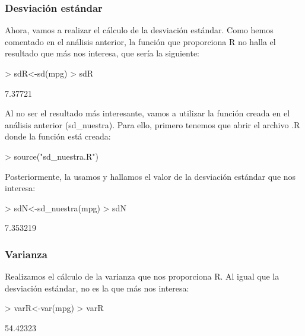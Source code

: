 \documentclass [a4paper] {article}
\begin{document}
\subsubsection{Desviación estándar}
Ahora, vamos a realizar el cálculo de la desviación estándar. Como hemos comentado en el análisis anterior,
la función que proporciona R no halla el resultado que más nos interesa, que sería la siguiente:

\begin{Schunk}
\begin{Sinput}
> sdR<-sd(mpg)
> sdR
\end{Sinput}
\begin{Soutput}
[1] 7.37721
\end{Soutput}
\end{Schunk}

Al no ser el resultado más interesante, vamos a utilizar la función creada en el análisis anterior (sd_nuestra). Para
ello, primero tenemos que abrir el archivo .R donde la función está creada:

\begin{Schunk}
\begin{Sinput}
> source("sd_nuestra.R")
\end{Sinput}
\end{Schunk}

Posteriormente, la usamos y hallamos el valor de la desviación estándar que nos interesa:

\begin{Schunk}
\begin{Sinput}
> sdN<-sd_nuestra(mpg)
> sdN
\end{Sinput}
\begin{Soutput}
[1] 7.353219
\end{Soutput}
\end{Schunk}

\subsubsection{Varianza}
Realizamos el cálculo de la varianza que nos proporciona R. Al igual que la desviación estándar,
no es la que más nos interesa:

\begin{Schunk}
\begin{Sinput}
> varR<-var(mpg)
> varR
\end{Sinput}
\begin{Soutput}
[1] 54.42323
\end{Soutput}
\end{Schunk}
\end{document}
